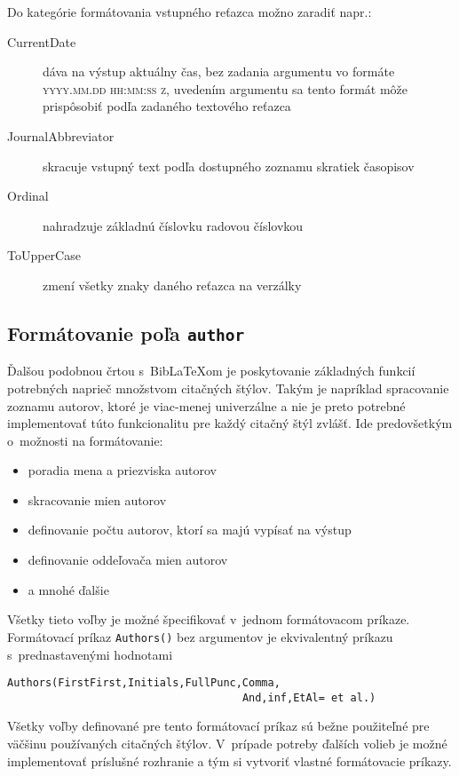 \documentclass[
  color,
  table,
  nolof,
  oneside,
]{fithesis3}
\newcommand{\cmd}[1]{\texttt{#1}}
\begin{document}
\noindent Do kategórie formátovania vstupného reťazca možno zaradiť napr.:

\begin{description}
\item[CurrentDate] dáva na výstup aktuálny čas, bez zadania argumentu vo formáte \textsc{yyyy.mm.dd hh:mm:ss z}, uvedením argumentu sa tento formát môže prispôsobiť podľa zadaného textového reťazca
\item[JournalAbbreviator] skracuje vstupný text podľa dostupného zoznamu skratiek časopisov
\item[Ordinal] nahradzuje základnú číslovku radovou číslovkou
\item[ToUpperCase] zmení všetky znaky daného reťazca na verzálky
\end{description}

\subsection{Formátovanie poľa \texttt{author}}

Ďalšou podobnou črtou s~BibLaTeXom je poskytovanie základných funkcií potrebných naprieč množstvom citačných štýlov. Takým je napríklad spracovanie zoznamu autorov, ktoré je viac-menej univerzálne a nie je preto potrebné implementovať túto funkcionalitu pre každý citačný štýl zvlášť. Ide predovšetkým o~možnosti na formátovanie:

\begin{itemize}
\item poradia mena a priezviska autorov
\item skracovanie mien autorov
\item definovanie počtu autorov, ktorí sa majú vypísať na výstup
\item definovanie oddeľovača mien autorov
\item a mnohé ďalšie
\end{itemize}

\noindent Všetky tieto voľby je možné špecifikovať v~jednom formátovacom príkaze. Formátovací príkaz \cmd{Authors()} bez argumentov je ekvivalentný príkazu s~prednastavenými hodnotami

\begin{verbatim}
Authors(FirstFirst,Initials,FullPunc,Comma,
                                     And,inf,EtAl= et al.)
\end{verbatim}

Všetky voľby definované pre tento formátovací príkaz sú bežne použiteľné pre väčšinu používaných citačných štýlov. V~prípade potreby ďalších volieb je možné implementovať príslušné rozhranie a tým si vytvoriť vlastné formátovacie príkazy.
\end{document}

